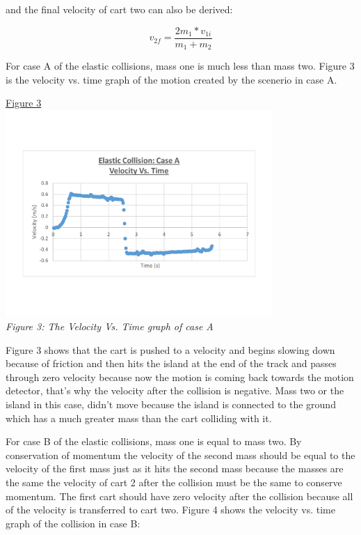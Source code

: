 \documentclass[aps,letterpaper,11pt]{revtex4}
\begin{document}
and the final velocity of cart two can also be derived:

$$ v_{2f} = \frac{2m_1*v_{1i}}{m_1+m_2}$$

For case A of the elastic collisions, mass one is much less than mass two. Figure 3 is the velocity vs. time graph of the motion created by the scenerio in case A.

\begin{center}
\underline{Figure 3}\\
\includegraphics[width=4in]{MassTwoWayBiggerThanMassOne.pdf}\\
\textit{Figure 3: The Velocity Vs. Time graph of case A}\\
\end{center}

Figure 3 shows that the cart is pushed to a velocity and begins slowing down because of friction and then hits the island at the end of the track and passes through zero velocity because now the motion is coming back towards the motion detector, that's why the velocity after the collision is negative. Mass two or the island in this case, didn't move because the island is connected to the ground which has a much greater mass than the cart colliding with it. 

For case B of the elastic collisions, mass one is equal to mass two. By conservation of momentum the velocity of the second mass should be equal to the velocity of the first mass just as it hits the second mass because the masses are the same the velocity of cart 2 after the collision must be the same to conserve momentum. The first cart should have zero velocity after the collision because all of the velocity is transferred to cart two. Figure 4 shows the velocity vs. time graph of the collision in case B:
\end{document}
